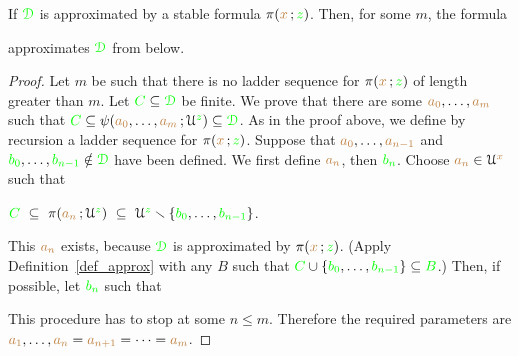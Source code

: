 \begin{lemma}\label{lem_stab_approx_below}
If ${\color{green}\EuScript D}$ is approximated by a stable formula $\pi({\color{brown} x}\,;{\color{green} z})$.
Then, for some $m$, the formula


approximates ${\color{green}\EuScript D}$ from below.
\end{lemma}

\begin{proof}
Let $m$ be such that there is no ladder sequence for $\pi({\color{brown} x}\,;{\color{green} z})$ of length greater than $m$.
Let ${\color{green} C}\subseteq{\color{green}\EuScript D}$ be finite.
We prove that there are some ${\color{brown} a_0},\dots,{\color{brown} a_m}$ such that ${\color{green} C}\subseteq\psi({\color{brown} a_0},\dots,{\color{brown} a_m}\,;\EuScript U^{\color{green} z})\subseteq{\color{green}\EuScript D}$.
As in the proof above, we define by recursion a ladder sequence for $\pi({\color{brown} x}\,;{\color{green} z})$.
Suppose that ${\color{brown} a_0},\dots,{\color{brown} a_{n-1}}$ and ${\color{green} b_0},\dots,{\color{green} b_{n-1}}\notin{\color{green}\EuScript D}$ have been defined.
We first define ${\color{brown} a_n}$, then ${\color{green} b_n}$. 
Choose ${\color{brown} a_n}\in\EuScript U^{\color{brown} x}$ such that 

\hfil${\color{green} C}\ \subseteq\ \pi({\color{brown} a_n}\,;\EuScript U^{\color{green} z})\ \subseteq\ \EuScript U^{\color{green} z}\smallsetminus\{{\color{green} b_0},\dots,{\color{green} b_{n-1}}\}$.

This ${\color{brown} a_n}$ exists, because ${\color{green}\EuScript D}$ is approximated by $\pi({\color{brown} x}\,;{\color{green} z})$.
(Apply Definition~\ref{def_approx} with any $B$ such that ${\color{green} C}\cup\{{\color{green} b_0},\dots,{\color{green} b_{n-1}}\}\subseteq{\color{green}B}$.)
Then, if possible, let ${\color{green} b_n}$ such that


This procedure has to stop at some $n\le m$.
Therefore the required parameters are ${\color{brown} a_1},\dots,{\color{brown} a_n}={\color{brown} a_{n+1}}=\dots={\color{brown} a_{m}}$.
\end{proof}



